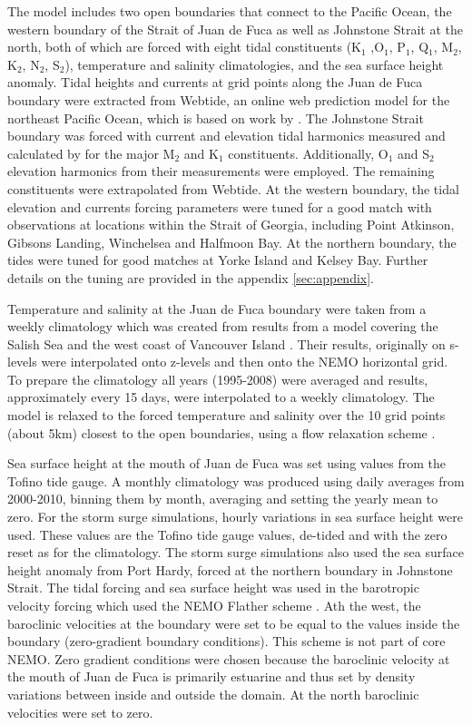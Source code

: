 \documentclass[pdftex,10pt]{article}
\begin{document}
The model includes two open boundaries that connect to the Pacific Ocean, the western boundary of the Strait of Juan de Fuca as well as Johnstone Strait at the north, both of which are forced with eight tidal constituents (K$_1$ ,O$_1$, P$_1$, Q$_1$, M$_2$, K$_2$, N$_2$, S$_2$), temperature and salinity climatologies, and the sea surface height anomaly. Tidal heights and currents at grid points along the Juan de Fuca boundary were extracted from Webtide, an online web prediction model for the northeast Pacific Ocean, which is based on work by \citet{foreman2000webtide}. The Johnstone Strait boundary was forced with current and elevation tidal harmonics measured and calculated by \citet{thomson1980johnstone} for the major M$_2$ and K$_1$ constituents. Additionally, O$_1$ and S$_2$ elevation harmonics from their measurements were employed. The remaining constituents were extrapolated from Webtide. At the western boundary, the tidal elevation and currents forcing parameters were tuned for a good match with observations at locations within the Strait of Georgia, including Point Atkinson, Gibsons Landing, Winchelsea and Halfmoon Bay. At the northern boundary, the tides were tuned for good matches at Yorke Island and Kelsey Bay. Further details on the tuning are provided in the appendix \ref{sec:appendix}. 

Temperature and salinity at the Juan de Fuca boundary were taken from a weekly climatology which was created from results from a model covering the Salish Sea and the west coast of Vancouver Island \citep{massonfine2012}.  Their results, originally on s-levels were interpolated onto z-levels and then onto the NEMO horizontal grid.  To prepare the climatology all years (1995-2008) were averaged and results, approximately every 15 days, were interpolated to a weekly climatology. The model is relaxed to the forced temperature and salinity over the 10 grid points (about 5km) closest to the open boundaries, using a flow relaxation scheme \citep{engedahl1995use}. %

Sea surface height at the mouth of Juan de Fuca was set using values from the Tofino tide gauge.  A monthly climatology was produced using daily averages from 2000-2010, binning them by month, averaging and setting the yearly mean to zero.  For the storm surge simulations, hourly variations in sea surface height were used.  These values are the Tofino tide gauge values, de-tided and with the zero reset as for the climatology. The storm surge simulations also used the sea surface height anomaly from Port Hardy, forced at the northern boundary in Johnstone Strait. The tidal forcing and sea surface height was used in the barotropic velocity forcing which used the NEMO Flather scheme \citep{flather1994storm, madec2012nemo}.
Ath the west, the baroclinic velocities at the boundary were set to be equal to the values inside the boundary (zero-gradient boundary conditions).  This scheme is not part of core NEMO.  Zero gradient conditions were chosen because the baroclinic velocity at the mouth of Juan de Fuca is primarily estuarine and thus set by density variations between inside and outside the domain. At the north baroclinic velocities were set to zero. 
\end{document}
